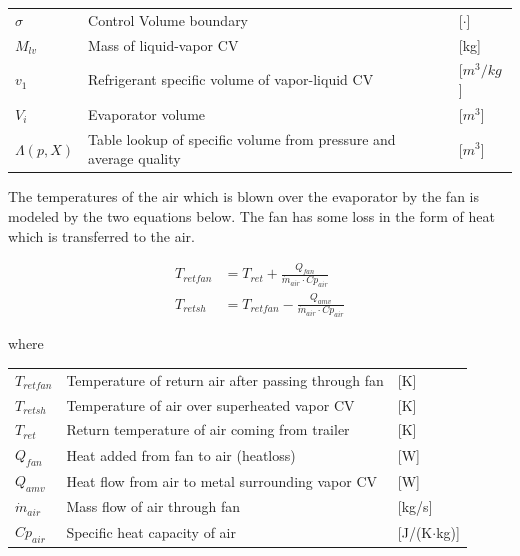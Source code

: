 \begin{center}
	\begin{tabular}{l p{10cm} l}
		$\sigma$   & Control Volume boundary                                           & [$\cdot$]            \\
		$M_{lv}$   & Mass of liquid-vapor CV                                           & [\si{kg}]            \\
		$v_1$      & Refrigerant specific volume of vapor-liquid CV                    & [$\si{m}^3/\si{kg}$] \\
		$V_i$      & Evaporator volume                                                 & [$\si{m}^3$]         \\
		$\Lambda(p,X)$ & Table lookup of specific volume from pressure and average quality & [$\si{m}^3$]
	\end{tabular}
\end{center}

The temperatures of the air which is blown over the evaporator by the fan is modeled by the two equations below. The fan has some loss in the form of heat which is transferred to the air.

\begin{align}
	T_{retfan} 		& = T_{ret} + \frac{Q_{fan}}{\dot{m}_{air} \cdot Cp_{air}} 		\label{eq:T_retfan} 		\\
	T_{retsh} 		& = T_{retfan} - \frac{Q_{amv}}{\dot{m}_{air} \cdot Cp_{air}} 	\label{eq:T_retsh}
\end{align}

where

\begin{center}
	\begin{tabular}{l p{10cm} l}
		$T_{retfan}$    & Temperature of return air after passing through fan & [\si{K}]                          \\
		$T_{retsh}$     & Temperature of air over superheated vapor CV        & [\si{K}]                          \\
		$T_{ret}$       & Return temperature of air coming from trailer       & [\si{K}]                          \\
		$Q_{fan}$       & Heat added from fan to air (heatloss)               & [\si{W}]                          \\
		$Q_{amv}$       & Heat flow from air to metal surrounding vapor CV    & [\si{W}]                          \\
		$\dot{m}_{air}$ & Mass flow of air through fan                        & [\si{kg}/\si{s}]                  \\
		$Cp_{air}$      & Specific heat capacity of air                       & [\si{J}/(\si{K}$ \cdot $\si{kg})]
	\end{tabular}
\end{center}

